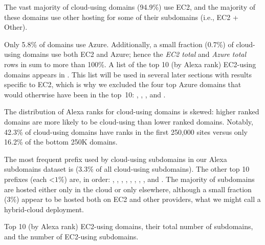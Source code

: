 The vast majority of cloud-using domains (94.9\%) use EC2, and the majority of
these domains use other hosting for some of their subdomains (i.e., EC2 + Other).  
{Only 5.8\% of domains use Azure.  Additionally, a small
fraction (0.7\%) of cloud-using domains use both EC2 and Azure; hence
the {\em EC2 total} and {\em Azure total} rows in 
sum to more than 100\%.
A list of the top 10 (by Alexa rank) EC2-using domains 
appears in . This list will be used in several later 
sections with results specific  to EC2, which is why we excluded the four 
top Azure domains 
that would otherwise have been in the top~10: , , , and .

The distribution of Alexa ranks for cloud-using domains 
is skewed: higher ranked domains are more likely 
to be cloud-using than lower ranked domains. 
Notably, 42.3\% of cloud-using domains have ranks in 
the first 250,000 sites versus only 16.2\% of the bottom 250K domains. 

The most frequent prefix used by cloud-using subdomains in our Alexa 
subdomains dataset is  (3.3\% of all cloud-using subdomains). The other top 10 prefixes
(each $\mathord{<}1\%$) are, in order:
, , , ,
, , , , and .
The majority of subdomains are hosted either only in
the cloud or only elsewhere, although a small fraction (3\%) appear to be
hosted both on EC2 and other providers,
what we might call a hybrid-cloud deployment.







\begin{table}[!t]
\center
\small

\caption{Top 10 (by Alexa rank) EC2-using domains, their total number of subdomains, and the
number of EC2-using subdomains.} 
\label{tab:top-15}
\end{table}

}
